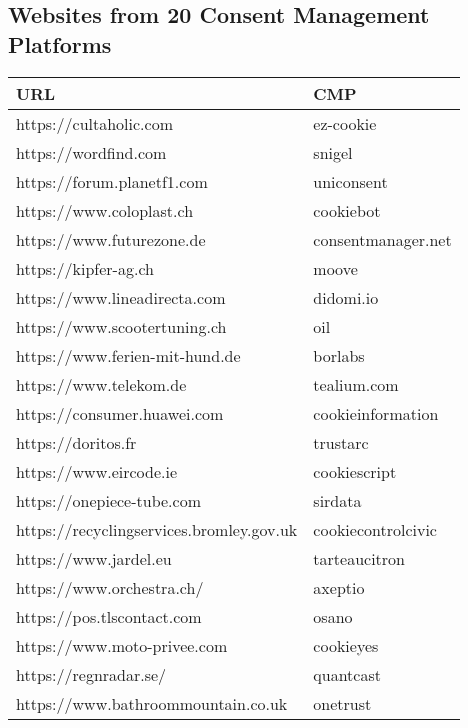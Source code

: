\subsection{Websites from 20 Consent Management Platforms}
\begin{center}
\begin{tabular}{ll}
	\toprule
	URL   & CMP        \\
	\midrule
    https://cultaholic.com & ez-cookie \\
    https://wordfind.com & snigel \\
    https://forum.planetf1.com & uniconsent \\
    https://www.coloplast.ch & cookiebot \\
    https://www.futurezone.de & consentmanager.net \\
    https://kipfer-ag.ch & moove \\
    https://www.lineadirecta.com & didomi.io \\
    https://www.scootertuning.ch & oil \\
    https://www.ferien-mit-hund.de & borlabs \\
    https://www.telekom.de & tealium.com \\
    https://consumer.huawei.com & cookieinformation \\
    https://doritos.fr & trustarc \\
    https://www.eircode.ie & cookiescript \\
    https://onepiece-tube.com & sirdata \\
    https://recyclingservices.bromley.gov.uk & cookiecontrolcivic \\
    https://www.jardel.eu & tarteaucitron \\
    https://www.orchestra.ch/ & axeptio \\
    https://pos.tlscontact.com & osano \\
    https://www.moto-privee.com & cookieyes \\
    https://regnradar.se/ & quantcast \\
    https://www.bathroommountain.co.uk & onetrust \\
	\bottomrule
\end{tabular}
\end{center}
